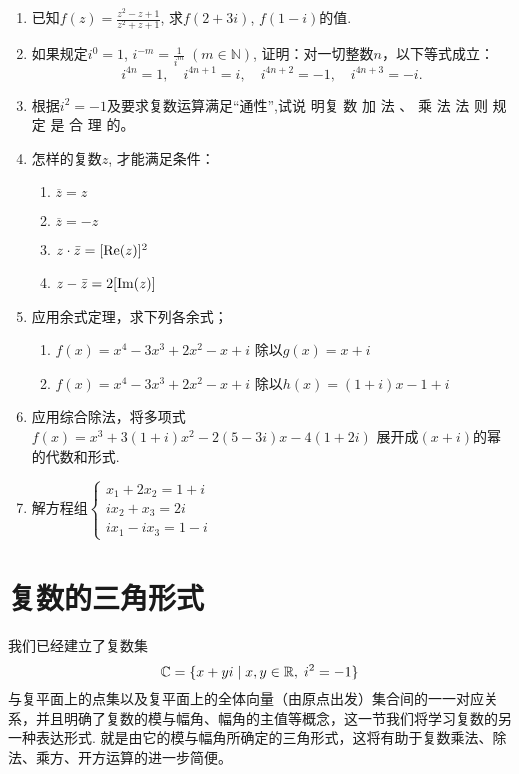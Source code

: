 \begin{enumerate}
\item 已知$f(z)=\frac{z^2-z+1}{z^2+z+1}$, 求$f(2+3i)$, $f(1-i)$的值.

\item  如果规定$i^0=1$, $i^{-m}=\frac{1}{i^m}\; (m\in\mathbb{N})$, 证明：对一切整数$n$，以下等式成立：
$$i^{4n}={1},\quad i^{4{n+1}}=i,\quad  i^{4{n+2}}=-1,\quad  i^{4n+3}=-i.$$
\item 根据$i^2=-1$及要求复数运算满足“通性”,试说
明复 数 加 法 、 乘 法 法 则 规 定 是 合 理 的。

\item 怎样的复数$z$, 才能满足条件：
\begin{multicols}{2}
\begin{enumerate}[(1)]
    \item $\overline {z}= z$
    \item $\overline {z}= -z$
    \item $z\cdot \bar z=[{\rm Re}(z)]^2$
    \item $z-\bar z=2[{\rm Im}(z)]$
\end{enumerate}    
\end{multicols}

\item 应用余式定理，求下列各余式；
\begin{enumerate}[(1)]
    \item $f( x) = x^{4}- 3x^{3}+ 2x^{2}- x+ i$
除以$g(x)=x+i$
\item $f( x) = x^{4}- 3x^{3}+ 2x^{2}- x+ i$
除以$h(x)=(1+i)x-1+i$
\end{enumerate}
\item 应用综合除法，将多项式
$f\left(x\right)=x^{3}+3\left({1+i}\right)x^{2}-2(5-3i)x-4\left(1+2i\right)$
展开成$(x+i)$的幂的代数和形式.

\item 解方程组$\begin{cases}
    x_1+2x_2=1+i\\
    ix_2+x_3=2i\\
    ix_1-ix_3=1-i
\end{cases}$
\end{enumerate}

\section{复数的三角形式}

我们已经建立了复数集
\[\mathbb{C}=\{x+yi\mid x,y\in\mathbb{R},\; i^2=-1\}\]
与复平面上的点集以及复平面上的全体向量（由原点出发）集合间的一一对应关系，并且明确了复数的模与幅角、幅角的主值等概念，这一节我们将学习复数的另一种表达形式. 就是由它的模与幅角所确定的三角形式，这将有助于复数乘法、除法、乘方、开方运算的进一步简便。

